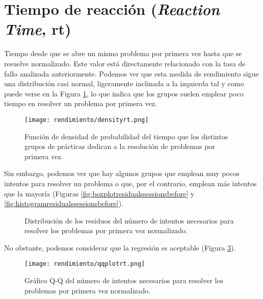 \section{Tiempo de reacción (\emph{Reaction Time}, rt)}

Tiempo desde que se abre un mismo problema por primera vez hasta que se resuelve normalizado. Este valor está directamente relacionado con la tasa de fallo analizada anteriormente. Podemos ver que esta medida de rendimiento sigue una distribución casi normal, ligeramente inclinada a la izquierda tal y como puede verse en la Figura \ref{fig:densityplotrt}, lo que indica que los grupos suelen emplear poco tiempo en resolver un problema por primera vez.

\begin{figure}[H]
    \centering
    \texttt{[image: rendimiento/densityrt.png]}
    \caption{Función de densidad de probabilidad del tiempo que los distintos grupos de prácticas dedican a la resolución de problemas por primera vez.}
    \label{fig:densityplotrt}
\end{figure}

Sin embargo, podemos ver que hay algunos grupos que emplean muy pocos intentos para resolver un problema o que, por el contrario, emplean más intentos que la mayoría (Figuras \ref{fig:boxplotresidualssessionsbefore} y \ref{fig:histogramresidualssessionsbefore}).

\begin{figure}[H]
\centering
{}\qquad
{}
\caption{Distribución de los residuos del número de intentos necesarios para resolver los problemas por primera vez normalizado.}
\label{fig:sessionsbefore}
\end{figure}

No obstante, podemos considerar que la regresión es aceptable (Figura \ref{fig:q-qsessionsbefore}).

\begin{figure}[H]
    \centering
    \texttt{[image: rendimiento/qqplotrt.png]}
    \caption{Gráfico Q-Q del número de intentos necesarios para resolver los problemas por primera vez normalizado.}
    \label{fig:q-qsessionsbefore}
\end{figure}

